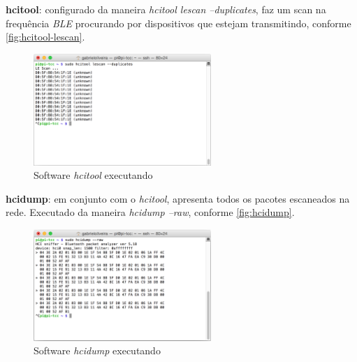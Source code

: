 \documentclass[
		12pt,				%
		openright,			%
		oneside,			%
		a4paper,			%
		chapter=TITLE,		%
		english,			%
		brazil				%
	]{abntex2}
\begin{document}
\begin{alineas}
	\item \textbf{hcitool}: configurado da maneira \textit{hcitool lescan --duplicates}, faz um scan na frequência \textit{BLE} procurando por dispositivos que estejam transmitindo, conforme \autoref{fig:hcitool-lescan}.
	
	\begin{figure}[htb]
		\caption{\label{fig:hcitool-lescan}Software \textit{hcitool} executando}
		\begin{center}
			\includegraphics[width=0.6\textwidth]{img/hcitool-lescan.png}
		\end{center}
	\end{figure}

	\item \textbf{hcidump}: em conjunto com o \textit{hcitool}, apresenta todos os pacotes escaneados na rede. Executado da maneira \textit{hcidump --raw}, conforme \autoref{fig:hcidump}.
	
	\begin{figure}[htb]
		\caption{\label{fig:hcidump}Software \textit{hcidump} executando}
		\begin{center}
			\includegraphics[width=0.6\textwidth]{img/hcidump.png}
		\end{center}
	\end{figure}

\end{alineas}
\end{document}
